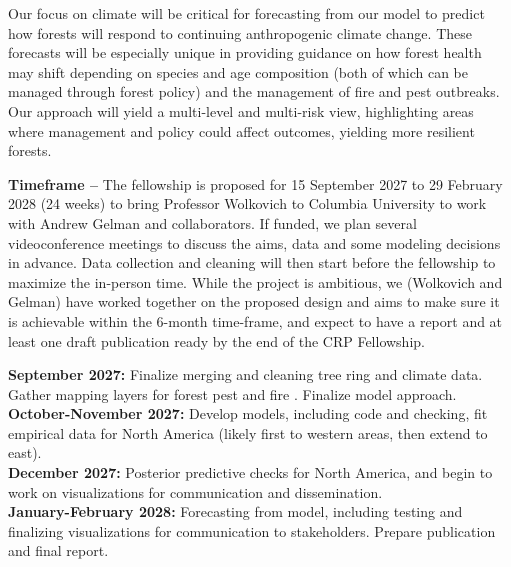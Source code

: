\documentclass[11pt]{article}
\begin{document}
Our focus on climate will be critical for forecasting from our model to predict how forests will respond to continuing anthropogenic climate change. These forecasts will be especially unique in providing guidance on how forest health may shift depending on species and age composition (both of which can be managed through forest policy) and the management of fire and pest outbreaks. Our approach will yield a multi-level and multi-risk view, highlighting areas where management and policy could affect outcomes, yielding more resilient forests.

{\bf Timeframe --} %
The fellowship is proposed for 15 September 2027 to 29 February 2028 (24 weeks) to bring Professor Wolkovich to Columbia University to work with Andrew Gelman and collaborators. If funded, we plan several videoconference meetings to discuss the aims, data and some modeling decisions in advance. Data collection and cleaning will then start before the fellowship to maximize the in-person time. While the project is ambitious, we (Wolkovich and Gelman) have worked together on the proposed design and aims to make sure it is achievable within the 6-month time-frame, and expect to have a report and at least one draft publication ready by the end of the CRP Fellowship. 

{\bf September 2027:} Finalize merging and cleaning tree ring and climate data. Gather mapping layers for forest pest and fire \citep[e.g.,][]{pane2026spatial,williams2025western}. Finalize model approach.\\
{\bf October-November 2027:} Develop models, including code and checking, fit empirical data for North America (likely first to western areas, then extend to east).\\
{\bf December 2027:} Posterior predictive checks \cite{gelman2026bayesian} for North America, and begin to work on visualizations for communication and dissemination.\\
{\bf January-February 2028:} Forecasting from model, including testing and finalizing visualizations for communication to stakeholders. Prepare publication and final report. 
\end{document}
